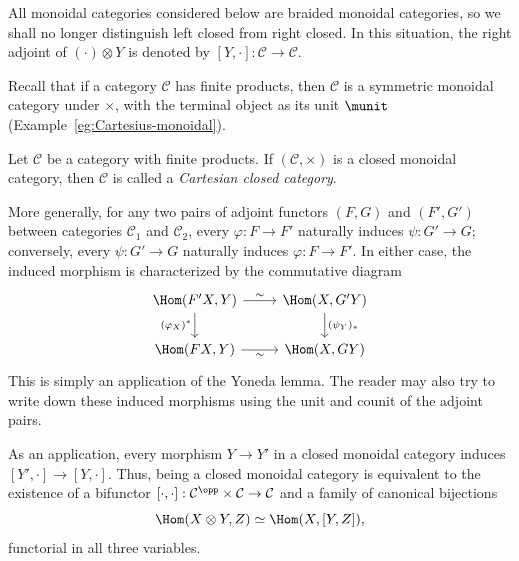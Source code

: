 All monoidal categories considered below are braided monoidal categories, so
we shall no longer distinguish left closed from right closed. In this
situation, the right adjoint of $(\cdot)\otimes Y$ is denoted by
$[Y,\cdot]:\mathcal{C}\to\mathcal{C}$.

Recall that if a category $\mathcal{C}$ has finite products, then
$\mathcal{C}$ is a symmetric monoidal category under $\times$, with the
terminal object as its unit $\munit$ (Example~\ref{eg:Cartesius-monoidal}).

\begin{definition}\label{def:Cartesian-closed}
	Let $\mathcal{C}$ be a category with finite products. If
	$(\mathcal{C},\times)$ is a closed monoidal category, then $\mathcal{C}$ is
	called a \emph{Cartesian closed category}.
\end{definition}

More generally, for any two pairs of adjoint functors $(F,G)$ and $(F',G')$
between categories $\mathcal{C}_1$ and $\mathcal{C}_2$, every
$\varphi:F\to F'$ naturally induces $\psi:G'\to G$; conversely, every
$\psi:G'\to G$ naturally induces $\varphi:F\to F'$. In either case, the
induced morphism is characterized by the commutative diagram
\[\begin{tikzcd}
	\Hom(F' X, Y) \arrow[r, "\sim"] \arrow[d, "{(\varphi_X)^*}"'] & \Hom(X, G'Y) \arrow[d, "{(\psi_Y)_*}"] \\
	\Hom(FX, Y) \arrow[r, "\sim"'] & \Hom(X, GY)
\end{tikzcd}\]
This is simply an application of the Yoneda lemma. The reader may also try to
write down these induced morphisms using the unit and counit of the adjoint
pairs.

As an application, every morphism $Y\to Y'$ in a closed monoidal category
induces $[Y',\cdot]\to[Y,\cdot]$. Thus, being a closed monoidal category is
equivalent to the existence of a bifunctor
$[\cdot,\cdot]:\mathcal{C}^{\opp}\times\mathcal{C}\to\mathcal{C}$ and a
family of canonical bijections
\begin{equation}\label{eqn:closed-monoidal-adj0}
	\Hom(X \otimes Y, Z) \simeq \Hom(X, [Y, Z]),
\end{equation}
functorial in all three variables.

